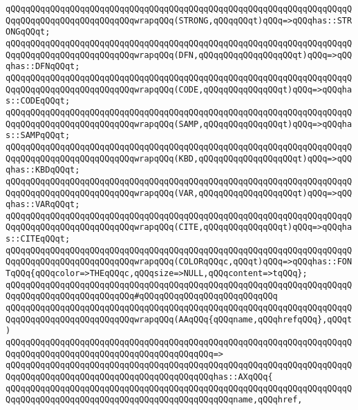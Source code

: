 \verb|qQQqqQQqqQQqqQQqqQQqqQQqqQQqqQQqqQQqqQQqqQQqqQQqqQQqqQQqqQQqqQQqqQQqqQQqqQQqqQQqqQQqqQQqqQQqqQQqwrapqQQq(STRONG,qQQqqQQqt)qQQq=>qQQqhas::STRONGqQQqt;|\newline
\verb|qQQqqQQqqQQqqQQqqQQqqQQqqQQqqQQqqQQqqQQqqQQqqQQqqQQqqQQqqQQqqQQqqQQqqQQqqQQqqQQqqQQqqQQqqQQqqQQqwrapqQQq(DFN,qQQqqQQqqQQqqQQqqQQqt)qQQq=>qQQqhas::DFNqQQqt;|\newline
\verb|qQQqqQQqqQQqqQQqqQQqqQQqqQQqqQQqqQQqqQQqqQQqqQQqqQQqqQQqqQQqqQQqqQQqqQQqqQQqqQQqqQQqqQQqqQQqqQQqwrapqQQq(CODE,qQQqqQQqqQQqqQQqt)qQQq=>qQQqhas::CODEqQQqt;|\newline
\verb|qQQqqQQqqQQqqQQqqQQqqQQqqQQqqQQqqQQqqQQqqQQqqQQqqQQqqQQqqQQqqQQqqQQqqQQqqQQqqQQqqQQqqQQqqQQqqQQqwrapqQQq(SAMP,qQQqqQQqqQQqqQQqt)qQQq=>qQQqhas::SAMPqQQqt;|\newline
\verb|qQQqqQQqqQQqqQQqqQQqqQQqqQQqqQQqqQQqqQQqqQQqqQQqqQQqqQQqqQQqqQQqqQQqqQQqqQQqqQQqqQQqqQQqqQQqqQQqwrapqQQq(KBD,qQQqqQQqqQQqqQQqqQQqt)qQQq=>qQQqhas::KBDqQQqt;|\newline
\verb|qQQqqQQqqQQqqQQqqQQqqQQqqQQqqQQqqQQqqQQqqQQqqQQqqQQqqQQqqQQqqQQqqQQqqQQqqQQqqQQqqQQqqQQqqQQqqQQqwrapqQQq(VAR,qQQqqQQqqQQqqQQqqQQqt)qQQq=>qQQqhas::VARqQQqt;|\newline
\verb|qQQqqQQqqQQqqQQqqQQqqQQqqQQqqQQqqQQqqQQqqQQqqQQqqQQqqQQqqQQqqQQqqQQqqQQqqQQqqQQqqQQqqQQqqQQqqQQqwrapqQQq(CITE,qQQqqQQqqQQqqQQqt)qQQq=>qQQqhas::CITEqQQqt;|\newline
\verb|qQQqqQQqqQQqqQQqqQQqqQQqqQQqqQQqqQQqqQQqqQQqqQQqqQQqqQQqqQQqqQQqqQQqqQQqqQQqqQQqqQQqqQQqqQQqqQQqwrapqQQq(COLORqQQqc,qQQqt)qQQq=>qQQqhas::FONTqQQq{qQQqcolor=>THEqQQqc,qQQqsize=>NULL,qQQqcontent=>tqQQq};|\newline
\verb|qQQqqQQqqQQqqQQqqQQqqQQqqQQqqQQqqQQqqQQqqQQqqQQqqQQqqQQqqQQqqQQqqQQqqQQqqQQqqQQqqQQqqQQqqQQqqQQq#qQQqqQQqqQQqqQQqqQQqqQQqqQQq|\newline
\verb|qQQqqQQqqQQqqQQqqQQqqQQqqQQqqQQqqQQqqQQqqQQqqQQqqQQqqQQqqQQqqQQqqQQqqQQqqQQqqQQqqQQqqQQqqQQqqQQqwrapqQQq(AAqQQq{qQQqname,qQQqhrefqQQq},qQQqt)|\newline
\verb|qQQqqQQqqQQqqQQqqQQqqQQqqQQqqQQqqQQqqQQqqQQqqQQqqQQqqQQqqQQqqQQqqQQqqQQqqQQqqQQqqQQqqQQqqQQqqQQqqQQqqQQqqQQqqQQq=>|\newline
\verb|qQQqqQQqqQQqqQQqqQQqqQQqqQQqqQQqqQQqqQQqqQQqqQQqqQQqqQQqqQQqqQQqqQQqqQQqqQQqqQQqqQQqqQQqqQQqqQQqqQQqqQQqqQQqqQQqhas::AXqQQq{|\newline
\verb|qQQqqQQqqQQqqQQqqQQqqQQqqQQqqQQqqQQqqQQqqQQqqQQqqQQqqQQqqQQqqQQqqQQqqQQqqQQqqQQqqQQqqQQqqQQqqQQqqQQqqQQqqQQqqQQqqQQqname,qQQqhref,|\newline

